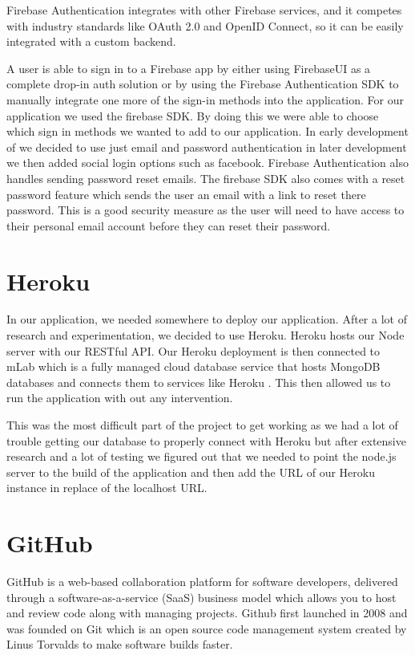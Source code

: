 Firebase Authentication integrates with other Firebase services, and it competes with industry standards like OAuth 2.0 and OpenID Connect, so it can be easily integrated with a custom backend. 

A user is able to sign in to a Firebase app by either using FirebaseUI as a complete drop-in auth solution or by using the Firebase Authentication SDK to manually integrate one more of the  sign-in methods into the application. For our application we used the firebase SDK. By doing this we were able to choose which sign in methods we wanted to add to our application. In early development of we decided to use just email and password authentication in later development we then added social login options such as facebook. Firebase Authentication also handles sending password reset emails. The firebase SDK also comes with a reset password feature which sends the user an email with a link to reset there password. This is a good security measure as the user will need to have access to their personal email account before they can reset their password.\cite{firebase}


\section{Heroku}
In our application, we needed somewhere to deploy our application. After a lot of research and experimentation, we decided to use Heroku\cite{heroku}. Heroku hosts our Node server with our RESTful API. Our Heroku deployment is then connected to mLab which is a fully managed cloud database service that hosts MongoDB databases and connects them to services like Heroku \cite{mlab}. This then allowed us to run the application with out any intervention. 

This was the most difficult part of the project to get working as we had a lot of trouble getting our database to properly connect with Heroku but after extensive research and a lot of testing we figured out that we needed to point the node.js server to the build of the application and then add the URL of our Heroku instance in replace of the localhost URL.


\section{GitHub}
GitHub is a web-based collaboration platform for software developers, delivered through a software-as-a-service (SaaS) business model which allows you to host and review code along with managing projects. Github first launched in 2008 and was founded on Git which is an open source code management system created by Linus Torvalds to make software builds faster.\cite{github}

